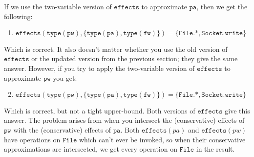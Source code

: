 \documentclass{llncs}
\newcommand{\keywadj}[1]{\mathtt{#1}}
\newcommand{\kwa}[1]{\keywadj{ #1 }}
\newcommand{\fx}[1]{ \kwa{effects}(#1) }
\begin{document}
\noindent
If we use the two-variable version of $\kwa{effects}$ to approximate $\kwa{pa}$, then we get the following:

\begin{enumerate}
	\item $\kwa{effects(type(pw), \{type(pa), type(fw)\}) = \{ File.*, Socket.write \}}$
\end{enumerate}

\noindent
Which is correct. It also doesn't matter whether you use the old version of $\kwa{effects}$ or the updated version from the previous section; they give the same answer. However, if you try to apply the two-variable version of $\kwa{effects}$ to approximate $\kwa{pw}$ you get:

\begin{enumerate}
	\setcounter{enumi}{1}
	\item $\kwa{effects(type(pw), \{type(pa), type(fw)\}) = \{File.*, Socket.write\}}$
\end{enumerate}

Which is correct, but not a tight upper-bound. Both versions of $\kwa{effects}$ give this answer. The problem arises from when you intersect the (conservative) effects of $\kwa{pw}$ with the (conservative) effects of $\kwa{pa}$. Both $\fx{pa}$ and $\fx{pw}$ have operations on $\kwa{File}$ which can't ever be invoked, so when their conservative approximations are intersected, we get every operation on $\kwa{File}$ in the result.
\end{document}
